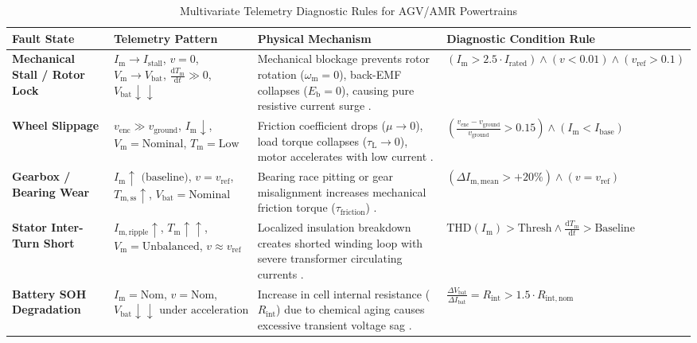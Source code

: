 \begin{table}[htbp]
\centering
\caption{Multivariate Telemetry Diagnostic Rules for AGV/AMR Powertrains}
\label{tab:diagnostic_matrix}
\small
\begin{tabular}{p{2.8cm}p{3.5cm}p{4.2cm}p{4.0cm}}
\toprule
\textbf{Fault State} & \textbf{Telemetry Pattern} & \textbf{Physical Mechanism} & \textbf{Diagnostic Condition Rule} \\
\midrule
\textbf{Mechanical Stall / Rotor Lock} & $I_{\mathrm{m}} \to I_{\mathrm{stall}}$, $v = 0$, $V_{\mathrm{m}} \to V_{\mathrm{bat}}$, $\frac{\mathrm{d}T_{\mathrm{m}}}{\mathrm{d}t} \gg 0$, $V_{\mathrm{bat}} \downarrow\downarrow$ & Mechanical blockage prevents rotor rotation ($\omega_{\mathrm{m}}=0$), back-EMF collapses ($E_{\mathrm{b}}=0$), causing pure resistive current surge \cite{Pillai2024Taxonomy, Li2023Prognostics}. & $(I_{\mathrm{m}} > 2.5 \cdot I_{\mathrm{rated}}) \land (v < 0.01) \land (v_{\mathrm{ref}} > 0.1)$ \\
\addlinespace
\textbf{Wheel Slippage} & $v_{\mathrm{enc}} \gg v_{\mathrm{ground}}$, $I_{\mathrm{m}} \downarrow$, $V_{\mathrm{m}} = \text{Nominal}$, $T_{\mathrm{m}} = \text{Low}$ & Friction coefficient drops ($\mu \to 0$), load torque collapses ($\tau_{\mathrm{L}} \to 0$), motor accelerates with low current \cite{Reina2009Doppler}. & $\left(\frac{v_{\mathrm{enc}} - v_{\mathrm{ground}}}{v_{\mathrm{ground}}} > 0.15\right) \land (I_{\mathrm{m}} < I_{\mathrm{base}})$ \\
\addlinespace
\textbf{Gearbox / Bearing Wear} & $I_{\mathrm{m}} \uparrow \text{ (baseline)}$, $v = v_{\mathrm{ref}}$, $T_{\mathrm{m,ss}} \uparrow$, $V_{\mathrm{bat}} = \text{Nominal}$ & Bearing race pitting or gear misalignment increases mechanical friction torque ($\tau_{\mathrm{friction}}$) \cite{Li2023Prognostics, Gultekin2022SignalFusion}. & $(\Delta I_{\mathrm{m,\text{mean}}} > +20\%) \land (v = v_{\mathrm{ref}})$ \\
\addlinespace
\textbf{Stator Inter-Turn Short} & $I_{\mathrm{m,\text{ripple}}} \uparrow$, $T_{\mathrm{m}} \uparrow\uparrow$, $V_{\mathrm{m}} = \text{Unbalanced}$, $v \approx v_{\mathrm{ref}}$ & Localized insulation breakdown creates shorted winding loop with severe transformer circulating currents \cite{Gultekin2022SignalFusion, Li2023Prognostics}. & $\text{THD}(I_{\mathrm{m}}) > \text{Thresh} \land \frac{\mathrm{d}T_{\mathrm{m}}}{\mathrm{d}t} > \text{Baseline}$ \\
\addlinespace
\textbf{Battery SOH Degradation} & $I_{\mathrm{m}} = \text{Nom}$, $v = \text{Nom}$, $V_{\mathrm{bat}} \downarrow\downarrow \text{ under acceleration}$ & Increase in cell internal resistance ($R_{\mathrm{int}}$) due to chemical aging causes excessive transient voltage sag \cite{Jaramillo2026Battery}. & $\frac{\Delta V_{\mathrm{bat}}}{\Delta I_{\mathrm{bat}}} = R_{\mathrm{int}} > 1.5 \cdot R_{\mathrm{int,\text{nom}}}$ \\

\end{tabular}
\end{table}
